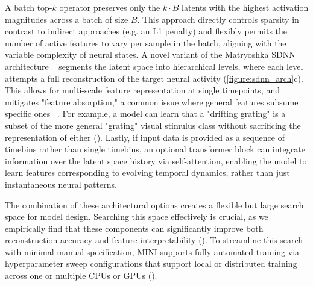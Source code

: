 A batch top-$k$ operator preserves only the $k \cdot B$ latents with the highest activation magnitudes across a batch of size $B$. This approach directly controls sparsity in contrast to indirect approaches (e.g. an L1 penalty) and flexibly permits the number of active features to vary per sample in the batch, aligning with the variable complexity of neural states. A novel variant of the Matryoshka SDNN architecture ~\cite{bussmann_2025_msae} segments the latent space into hierarchical levels, where each level attempts a full reconstruction of the target neural activity (\autoref{figure:sdnn_arch}c). This allows for multi-scale feature representation at single timepoints, and mitigates "feature absorption," a common issue where general features subsume specific ones ~\cite{chanin_2024_feature_absorption}. For example, a model can learn that a "drifting grating" is a subset of the more general "grating" visual stimulus class without sacrificing the representation of either (). Lastly, if input data is provided as a sequence of timebins rather than single timebins, an optional transformer block can integrate information over the latent space history via self-attention, enabling the model to learn features corresponding to evolving temporal dynamics, rather than just instantaneous neural patterns. 

The combination of these architectural options creates a flexible but large search space for model design. Searching this space effectively is crucial, as we empirically find that these components can significantly improve both reconstruction accuracy and feature interpretability (). To streamline this search with minimal manual specification, MINI supports fully automated training via hyperparameter sweep configurations that support local or distributed training across one or multiple CPUs or GPUs ().

